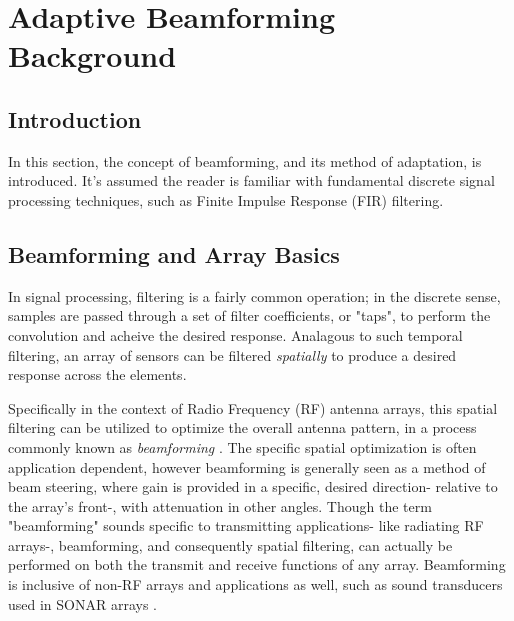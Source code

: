 \chapter{Adaptive Beamforming Background}
\label{chap:abf_background}

\section{Introduction}

In this section, the concept of beamforming, and its method of adaptation, is introduced. It's assumed the reader is familiar with fundamental discrete signal processing techniques, such as Finite Impulse Response (FIR) filtering.






\section{Beamforming and Array Basics}

In signal processing, filtering is a fairly common operation; in the discrete sense, samples are passed through a set of filter coefficients, or "taps", to perform the convolution and acheive the desired response. Analagous to such temporal filtering, an array of sensors can be filtered \emph{spatially} to produce a desired response across the elements.

Specifically in the context of Radio Frequency (RF) antenna arrays, this spatial filtering can be utilized to optimize the overall antenna pattern, in a process commonly known as \emph{beamforming} \citep{van_veen_and_buckley}. The specific spatial optimization is often application dependent, however beamforming is generally seen as a method of beam steering, where gain is provided in a specific, desired direction- relative to the array's front-, with attenuation in other angles. Though the term "beamforming" sounds specific to transmitting applications- like radiating RF arrays-, beamforming, and consequently spatial filtering, can actually be performed on both the transmit and receive functions of any array. Beamforming is inclusive of non-RF arrays and applications as well, such as sound transducers used in SONAR arrays \citep{van_veen_and_buckley}.


